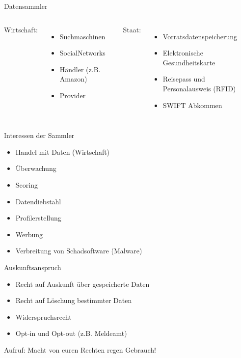 \begin{frame}{Datensammler}
	\begin{columns}
			Wirtschaft:
			\begin{itemize}
				\item Suchmaschinen
				\item SocialNetworks
				\item H\"andler (z.B. Amazon)
				\item Provider
			\end{itemize}
			Staat:
			\begin{itemize}
				\item Vorratsdatenspeicherung
				\item Elektronische Gesundheitskarte
				\item Reisepass und Personalausweis (RFID)
				\item SWIFT Abkommen
			\end{itemize}
	\end{columns}
\end{frame}
\begin{frame}{Interessen der Sammler}
	\begin{itemize}
		\item Handel mit Daten (Wirtschaft)
		\item \"Uberwachung
		\item Scoring
		\item Datendiebstahl
		\item Profilerstellung
		\item Werbung
		\item Verbreitung von Schadsoftware (Malware)
	\end{itemize}
\end{frame}
\begin{frame}{Auskunftsanspruch}
	\begin{itemize}
		\item Recht auf Auskunft \"uber gespeicherte Daten
		\item Recht auf L\"oschung bestimmter Daten
		\item Widerspruchsrecht
		\item Opt-in und Opt-out (z.B. Meldeamt)
	\end{itemize}
	\begin{block}{Aufruf:}
		Macht von euren Rechten regen Gebrauch!
	\end{block}
\end{frame}


